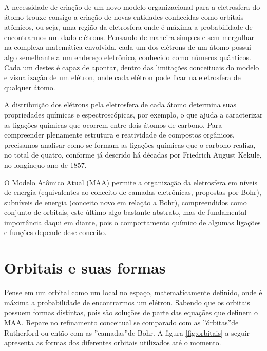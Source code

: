 \documentclass[a4paper,12pt]{book}
\begin{document}
A necessidade de criação de um novo modelo organizacional para a eletrosfera do átomo trouxe consigo a criação de novas entidades conhecidas como orbitais atômicos, ou seja, uma região da eletrosfera onde é máxima a probabilidade de encontrarmos um dado elétrons. Pensando de maneira simples e sem mergulhar na complexa matemática envolvida, cada um dos elétrons de um átomo possui algo semelhante a um endereço eletrônico, conhecido como números quânticos. Cada um destes é capaz de apontar, dentro das limitações conceituais do modelo e visualização de um elétron, onde cada elétron pode ficar na eletrosfera de qualquer átomo.

A distribuição dos elétrons pela eletrosfera de cada átomo determina suas propriedades químicas e espectroscópicas, por exemplo, o que ajuda a caracterizar as ligações químicas que ocorrem entre dois átomos de carbono. Para compreender plenamente estrutura e reatividade de compostos orgânicos, precisamos analisar como se formam as ligações químicas que o carbono realiza, no total de quatro, conforme já descrido há décadas por Friedrich August Kekule, no longínquo ano de 1857.

O Modelo Atômico Atual (MAA) permite a organização da eletrosfera em níveis de energia (equivalentes ao conceito de camadas eletrônicas, propostas por Bohr), subníveis de energia (conceito novo em relação a Bohr), compreendidos como conjunto de orbitais, este último algo bastante abstrato, mas de fundamental importância daqui em diante, pois o comportamento químico de algumas ligações e funções depende dese conceito.

\section{Orbitais e suas formas}
Pense em um orbital como um local no espaço, matematicamente definido, onde é máxima a probabilidade de encontrarmos um elétron. Sabendo que os orbitais possuem formas distintas, pois são soluções de parte das equações que definem o MAA. Repare no refinamento conceitual se comparado com as ”órbitas”de Rutherford ou então com as ”camadas”de Bohr. A figura \ref{fig:orbitais} a seguir apresenta as formas dos diferentes orbitais utilizados até o momento.
\end{document}
